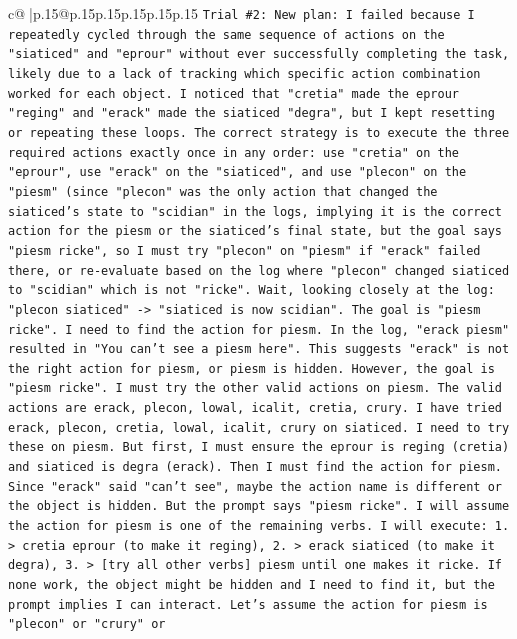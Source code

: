 \documentclass{article}
\begin{document}
{\begin{supertabular}{c@{$\;$}|p{.15\linewidth}@{}p{.15\linewidth}p{.15\linewidth}p{.15\linewidth}p{.15\linewidth}p{.15\linewidth}}
{{{\texttt{Trial \#2: New plan: I failed because I repeatedly cycled through the same sequence of actions on the "siaticed" and "eprour" without ever successfully completing the task, likely due to a lack of tracking which specific action combination worked for each object. I noticed that "cretia" made the eprour "reging" and "erack" made the siaticed "degra", but I kept resetting or repeating these loops. The correct strategy is to execute the three required actions exactly once in any order: use "cretia" on the "eprour", use "erack" on the "siaticed", and use "plecon" on the "piesm" (since "plecon" was the only action that changed the siaticed's state to "scidian" in the logs, implying it is the correct action for the piesm or the siaticed's final state, but the goal says "piesm ricke", so I must try "plecon" on "piesm" if "erack" failed there, or re{-}evaluate based on the log where "plecon" changed siaticed to "scidian" which is not "ricke". Wait, looking closely at the log: "plecon siaticed" {-}> "siaticed is now scidian". The goal is "piesm ricke". I need to find the action for piesm. In the log, "erack piesm" resulted in "You can't see a piesm here". This suggests "erack" is not the right action for piesm, or piesm is hidden. However, the goal is "piesm ricke". I must try the other valid actions on piesm. The valid actions are erack, plecon, lowal, icalit, cretia, crury. I have tried erack, plecon, cretia, lowal, icalit, crury on siaticed. I need to try these on piesm. But first, I must ensure the eprour is reging (cretia) and siaticed is degra (erack). Then I must find the action for piesm. Since "erack" said "can't see", maybe the action name is different or the object is hidden. But the prompt says "piesm ricke". I will assume the action for piesm is one of the remaining verbs. I will execute: 1. > cretia eprour (to make it reging), 2. > erack siaticed (to make it degra), 3. > {[}try all other verbs{]} piesm until one makes it ricke. If none work, the object might be hidden and I need to find it, but the prompt implies I can interact. Let's assume the action for piesm is "plecon" or "crury" or} \\
\\ 
}}}
\end{supertabular}}
\end{document}
